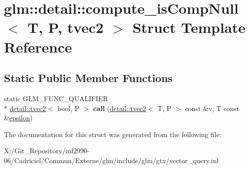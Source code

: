\hypertarget{structglm_1_1detail_1_1compute__is_comp_null_3_01_t_00_01_p_00_01tvec2_01_4}{\section{glm\-:\-:detail\-:\-:compute\-\_\-is\-Comp\-Null$<$ T, P, tvec2 $>$ Struct Template Reference}
\label{structglm_1_1detail_1_1compute__is_comp_null_3_01_t_00_01_p_00_01tvec2_01_4}
}
\subsection*{Static Public Member Functions}
\begin{DoxyCompactItemize}
\item 
\hypertarget{structglm_1_1detail_1_1compute__is_comp_null_3_01_t_00_01_p_00_01tvec2_01_4_abf9b6241b4469888505eb8d3a5f5afb5}{static G\-L\-M\-\_\-\-F\-U\-N\-C\-\_\-\-Q\-U\-A\-L\-I\-F\-I\-E\-R \\*
\hyperlink{structglm_1_1detail_1_1tvec2}{detail\-::tvec2}$<$ bool, P $>$ {\bfseries call} (\hyperlink{structglm_1_1detail_1_1tvec2}{detail\-::tvec2}$<$ T, P $>$ const \&v, T const \&\hyperlink{group__gtc__constants_gacb41049b8d22c8aa90e362b96c524feb}{epsilon})}\label{structglm_1_1detail_1_1compute__is_comp_null_3_01_t_00_01_p_00_01tvec2_01_4_abf9b6241b4469888505eb8d3a5f5afb5}

\end{DoxyCompactItemize}


The documentation for this struct was generated from the following file\-:\begin{DoxyCompactItemize}
\item 
X\-:/\-Git\-\_\-\-Repository/inf2990-\/06/\-Cadriciel/\-Commun/\-Externe/glm/include/glm/gtx/vector\-\_\-query.\-inl\end{DoxyCompactItemize}
